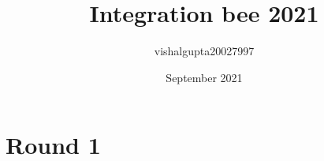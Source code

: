 \documentclass{article}
\title{Integration bee 2021}
\author{vishalgupta20027997 }
\date{September 2021}
\begin{document}






\maketitle







\section{Round 1}

\end{document}
